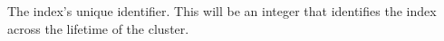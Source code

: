 The index's unique identifier.  This will be an integer that identifies the
index across the lifetime of the cluster.
